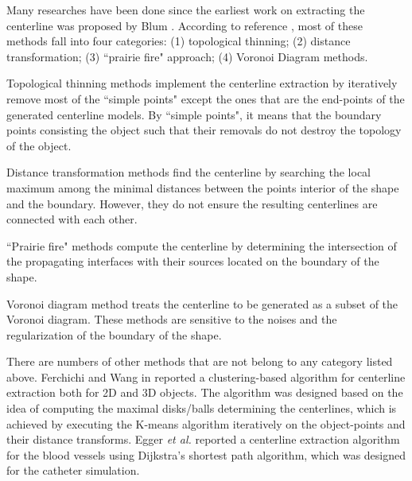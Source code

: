 Many researches have been done since the earliest work on extracting the centerline was proposed by Blum \cite{Blum1967}.
According to reference \cite{Ogniewicz1995}, most of these methods fall into four categories: (1) topological thinning; (2) distance transformation; (3) ``prairie fire" approach; (4) Voronoi Diagram methods. %

Topological thinning methods \cite{Ma2002,Sadleir2002} implement the centerline extraction by iteratively remove most of the ``simple points" except the ones that are the end-points of the generated centerline models. %
By ``simple points", it means that the boundary points consisting the object such that their removals do not destroy the topology of the object.

Distance transformation methods \cite{Niblack1992} find the centerline by searching the local maximum among the minimal distances between the points interior of the shape and the boundary. %
However, they do not ensure the resulting centerlines are connected with each other.

``Prairie fire" methods \cite{Blum1967,Leymarie1992} compute the centerline by determining the intersection of the propagating interfaces with their sources located on the boundary of the shape. %

Voronoi diagram method \cite{Sherbrooke1996,Antiga2003} treats the centerline to be generated as a subset of the Voronoi diagram.
These methods are sensitive to the noises and the regularization of the boundary of the shape.

There are numbers of other methods that are not belong to any category listed above.
Ferchichi and Wang in \cite{Ferchichi2006} reported a clustering-based algorithm for centerline extraction both for 2D and 3D objects.
The algorithm was designed based on the idea of computing the maximal disks/balls determining the centerlines, which is achieved by executing the K-means algorithm iteratively on the object-points and their distance transforms. %
Egger \textit{et al.} \cite{Egger2007} reported a centerline extraction algorithm for the blood vessels using Dijkstra's shortest path algorithm, which was designed for the catheter simulation. %
